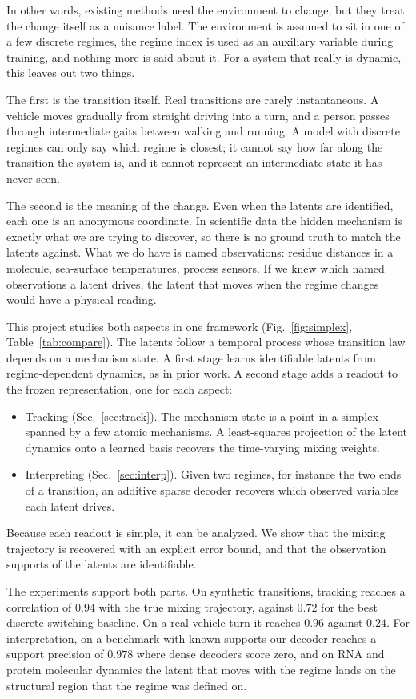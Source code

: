 \documentclass[10pt,twocolumn,letterpaper]{article}
\theoremstyle{definition}
\begin{document}
In other words, existing methods need the environment to change, but they treat the change itself as a nuisance label.
The environment is assumed to sit in one of a few discrete regimes, the regime index is used as an auxiliary variable during training, and nothing more is said about it.
For a system that really is dynamic, this leaves out two things.

The first is the transition itself.
Real transitions are rarely instantaneous.
A vehicle moves gradually from straight driving into a turn, and a person passes through intermediate gaits between walking and running.
A model with discrete regimes can only say which regime is closest; it cannot say how far along the transition the system is, and it cannot represent an intermediate state it has never seen.

The second is the meaning of the change.
Even when the latents are identified, each one is an anonymous coordinate.
In scientific data the hidden mechanism is exactly what we are trying to discover, so there is no ground truth to match the latents against.
What we do have is named observations: residue distances in a molecule, sea-surface temperatures, process sensors.
If we knew which named observations a latent drives, the latent that moves when the regime changes would have a physical reading.

This project studies both aspects in one framework (Fig.~\ref{fig:simplex}, Table~\ref{tab:compare}).
The latents follow a temporal process whose transition law depends on a mechanism state.
A first stage learns identifiable latents from regime-dependent dynamics, as in prior work.
A second stage adds a readout to the frozen representation, one for each aspect:
\begin{itemize}
\item Tracking (Sec.~\ref{sec:track}).
The mechanism state is a point in a simplex spanned by a few atomic mechanisms.
A least-squares projection of the latent dynamics onto a learned basis recovers the time-varying mixing weights.
\item Interpreting (Sec.~\ref{sec:interp}).
Given two regimes, for instance the two ends of a transition, an additive sparse decoder recovers which observed variables each latent drives.
\end{itemize}
Because each readout is simple, it can be analyzed.
We show that the mixing trajectory is recovered with an explicit error bound, and that the observation supports of the latents are identifiable.

The experiments support both parts.
On synthetic transitions, tracking reaches a correlation of $0.94$ with the true mixing trajectory, against $0.72$ for the best discrete-switching baseline.
On a real vehicle turn it reaches $0.96$ against $0.24$.
For interpretation, on a benchmark with known supports our decoder reaches a support precision of $0.978$ where dense decoders score zero, and on RNA and protein molecular dynamics the latent that moves with the regime lands on the structural region that the regime was defined on.
\end{document}
